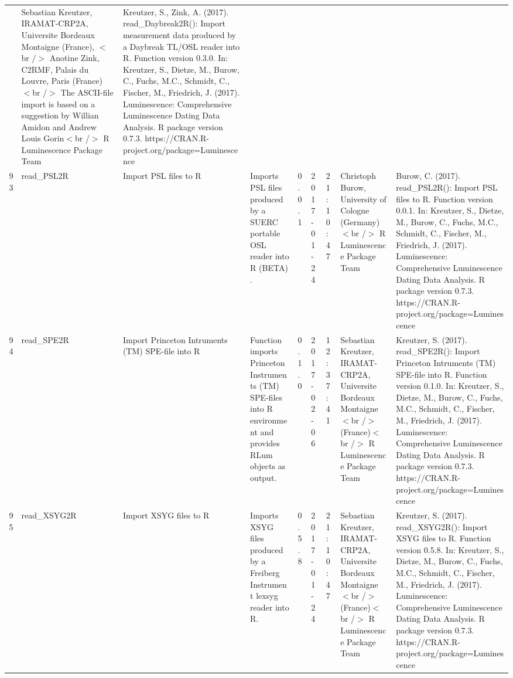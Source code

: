 \begin{table}[ht]
\begin{tabular}{rllllllll}
 & Sebastian Kreutzer, IRAMAT-CRP2A, Universite Bordeaux Montaigne (France),  $<$br /$>$ Anotine Zink, C2RMF, Palais du Louvre, Paris (France) $<$br /$>$  The ASCII-file import is based on a suggestion by Willian Amidon and Andrew Louis Gorin$<$br /$>$  R Luminescence Package Team & Kreutzer, S., Zink, A. (2017). read\_Daybreak2R(): Import measurement data produced by a Daybreak TL/OSL reader into R. Function version 0.3.0. In: Kreutzer, S., Dietze, M., Burow, C., Fuchs, M.C., Schmidt, C., Fischer, M., Friedrich, J. (2017). Luminescence: Comprehensive Luminescence Dating Data Analysis. R package version 0.7.3. https://CRAN.R-project.org/package=Luminescence
 \\ 
  93 & read\_PSL2R & Import PSL files to R & Imports PSL files produced by a SUERC portable OSL reader into R  (BETA) . & 0.0.1 & 2017-01-24 & 21:10:47
 & Christoph Burow, University of Cologne (Germany)$<$br /$>$  R Luminescence Package Team & Burow, C. (2017). read\_PSL2R(): Import PSL files to R. Function version 0.0.1. In: Kreutzer, S., Dietze, M., Burow, C., Fuchs, M.C., Schmidt, C., Fischer, M., Friedrich, J. (2017). Luminescence: Comprehensive Luminescence Dating Data Analysis. R package version 0.7.3. https://CRAN.R-project.org/package=Luminescence
 \\ 
  94 & read\_SPE2R & Import Princeton Intruments (TM) SPE-file into R & Function imports Princeton Instruments (TM) SPE-files into R environment and provides  RLum  objects as output. & 0.1.0 & 2017-02-06 & 12:37:41
 & Sebastian Kreutzer, IRAMAT-CRP2A, Universite Bordeaux Montaigne$<$br /$>$ (France)$<$br /$>$  R Luminescence Package Team & Kreutzer, S. (2017). read\_SPE2R(): Import Princeton Intruments (TM) SPE-file into R. Function version 0.1.0. In: Kreutzer, S., Dietze, M., Burow, C., Fuchs, M.C., Schmidt, C., Fischer, M., Friedrich, J. (2017). Luminescence: Comprehensive Luminescence Dating Data Analysis. R package version 0.7.3. https://CRAN.R-project.org/package=Luminescence
 \\ 
  95 & read\_XSYG2R & Import XSYG files to R & Imports XSYG files produced by a Freiberg Instrument lexsyg reader into R. & 0.5.8 & 2017-01-24 & 21:10:47
 & Sebastian Kreutzer, IRAMAT-CRP2A, Universite Bordeaux Montaigne$<$br /$>$ (France)$<$br /$>$  R Luminescence Package Team & Kreutzer, S. (2017). read\_XSYG2R(): Import XSYG files to R. Function version 0.5.8. In: Kreutzer, S., Dietze, M., Burow, C., Fuchs, M.C., Schmidt, C., Fischer, M., Friedrich, J. (2017). Luminescence: Comprehensive Luminescence Dating Data Analysis. R package version 0.7.3. https://CRAN.R-project.org/package=Luminescence

\end{tabular}
\end{table}
